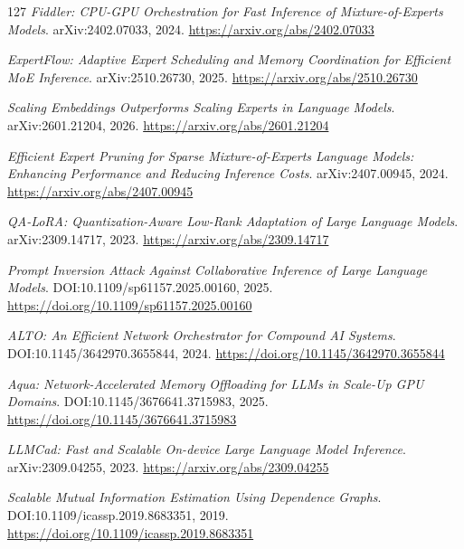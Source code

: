 \documentclass[11pt,a4paper]{article}
\begin{document}
\begin{thebibliography}{127}
\newblock \emph{Fiddler: CPU-GPU Orchestration for Fast Inference of Mixture-of-Experts Models}.
\newblock arXiv:2402.07033, 2024.
\newblock \url{https://arxiv.org/abs/2402.07033}

\newblock \emph{ExpertFlow: Adaptive Expert Scheduling and Memory Coordination for Efficient MoE Inference}.
\newblock arXiv:2510.26730, 2025.
\newblock \url{https://arxiv.org/abs/2510.26730}

\newblock \emph{Scaling Embeddings Outperforms Scaling Experts in Language Models}.
\newblock arXiv:2601.21204, 2026.
\newblock \url{https://arxiv.org/abs/2601.21204}

\newblock \emph{Efficient Expert Pruning for Sparse Mixture-of-Experts Language Models: Enhancing Performance and Reducing Inference Costs}.
\newblock arXiv:2407.00945, 2024.
\newblock \url{https://arxiv.org/abs/2407.00945}

\newblock \emph{QA-LoRA: Quantization-Aware Low-Rank Adaptation of Large Language Models}.
\newblock arXiv:2309.14717, 2023.
\newblock \url{https://arxiv.org/abs/2309.14717}

\newblock \emph{Prompt Inversion Attack Against Collaborative Inference of Large Language Models}.
\newblock DOI:10.1109/sp61157.2025.00160, 2025.
\newblock \url{https://doi.org/10.1109/sp61157.2025.00160}

\newblock \emph{ALTO: An Efficient Network Orchestrator for Compound AI Systems}.
\newblock DOI:10.1145/3642970.3655844, 2024.
\newblock \url{https://doi.org/10.1145/3642970.3655844}

\newblock \emph{Aqua: Network-Accelerated Memory Offloading for LLMs in Scale-Up GPU Domains}.
\newblock DOI:10.1145/3676641.3715983, 2025.
\newblock \url{https://doi.org/10.1145/3676641.3715983}

\newblock \emph{LLMCad: Fast and Scalable On-device Large Language Model Inference}.
\newblock arXiv:2309.04255, 2023.
\newblock \url{https://arxiv.org/abs/2309.04255}

\newblock \emph{Scalable Mutual Information Estimation Using Dependence Graphs}.
\newblock DOI:10.1109/icassp.2019.8683351, 2019.
\newblock \url{https://doi.org/10.1109/icassp.2019.8683351}


\end{thebibliography}
\end{document}
